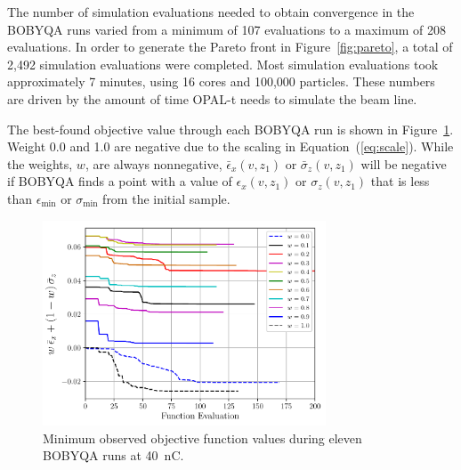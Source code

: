 The number of simulation evaluations needed to obtain convergence
in the BOBYQA runs varied from a minimum of 107 evaluations to a maximum of 208 
evaluations. In order to generate the Pareto front in
Figure~\ref{fig:pareto}, a total of 2,492 simulation evaluations were completed.
Most simulation evaluations took approximately 7 minutes, using 16 cores and 100,000 particles. These numbers are driven by the amount of time OPAL-t needs to simulate the beam line. 

The best-found objective value through each BOBYQA run is shown in Figure~\ref{fig:iterations}. 
Weight 0.0 and 1.0 are negative due to the scaling in Equation~(\ref{eq:scale}). While the weights, $w$, are always nonnegative, 
$\bar{\epsilon}_x (v,z_1)$ or $\bar{\sigma}_z(v,z_1)$ will be negative if BOBYQA finds a point with a value of 
$\epsilon_x(v,z_1)$ or $\sigma_z(v,z_1)$ that is less than $\epsilon_{\min}$ or $\sigma_{\min}$ from the initial sample. 
\begin{figure}%
	\begin{center}
		\includegraphics[width=0.75\textwidth]{images/THPAB155f2}
		\caption{\label{fig:iterations}Minimum observed objective function values during eleven BOBYQA runs at \SI{40}{nC}.}
	\end{center}
\end{figure}

